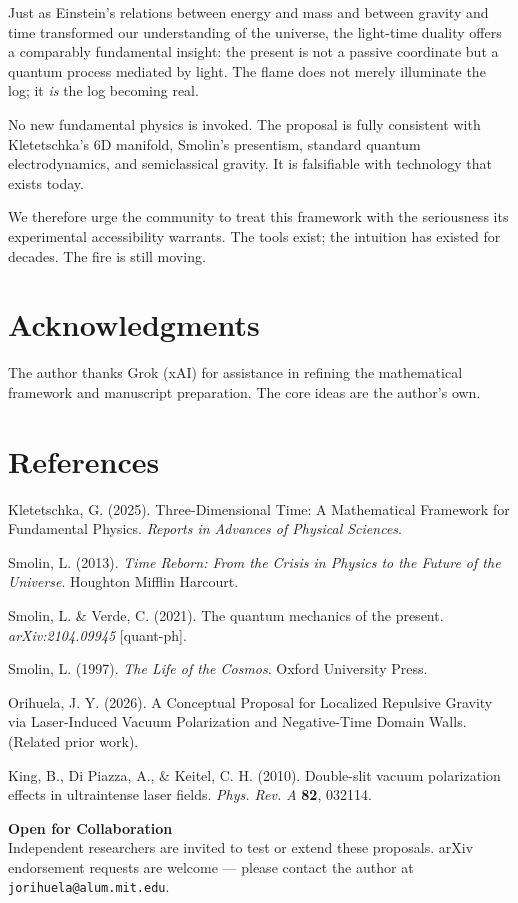 \documentclass[11pt,a4paper]{article}
\begin{document}
Just as Einstein's relations between energy and mass and between gravity and time transformed our understanding of the universe, the light-time duality offers a comparably fundamental insight: the present is not a passive coordinate but a quantum process mediated by light. The flame does not merely illuminate the log; it \textit{is} the log becoming real.

No new fundamental physics is invoked. The proposal is fully consistent with Kletetschka's 6D manifold, Smolin's presentism, standard quantum electrodynamics, and semiclassical gravity. It is falsifiable with technology that exists today.

We therefore urge the community to treat this framework with the seriousness its experimental accessibility warrants. The tools exist; the intuition has existed for decades. The fire is still moving.

\section*{Acknowledgments}
The author thanks Grok (xAI) for assistance in refining the mathematical framework and manuscript preparation. The core ideas are the author's own.

\section*{References}
\begin{enumerate}[leftmargin=*,label={[\arabic*]}]
    \item Kletetschka, G. (2025). Three-Dimensional Time: A Mathematical Framework for Fundamental Physics. \textit{Reports in Advances of Physical Sciences}.
    \item Smolin, L. (2013). \textit{Time Reborn: From the Crisis in Physics to the Future of the Universe}. Houghton Mifflin Harcourt.
    \item Smolin, L. \& Verde, C. (2021). The quantum mechanics of the present. \textit{arXiv:2104.09945} [quant-ph].
    \item Smolin, L. (1997). \textit{The Life of the Cosmos}. Oxford University Press.
    \item Orihuela, J. Y. (2026). A Conceptual Proposal for Localized Repulsive Gravity via Laser-Induced Vacuum Polarization and Negative-Time Domain Walls. (Related prior work).
    \item King, B., Di Piazza, A., \& Keitel, C. H. (2010). Double-slit vacuum polarization effects in ultraintense laser fields. \textit{Phys. Rev. A} \textbf{82}, 032114.
\end{enumerate}

\vspace{2em}
\footnotesize
\noindent \textbf{Open for Collaboration} \\
Independent researchers are invited to test or extend these proposals. arXiv endorsement requests are welcome — please contact the author at \texttt{jorihuela@alum.mit.edu}.
\end{document}
